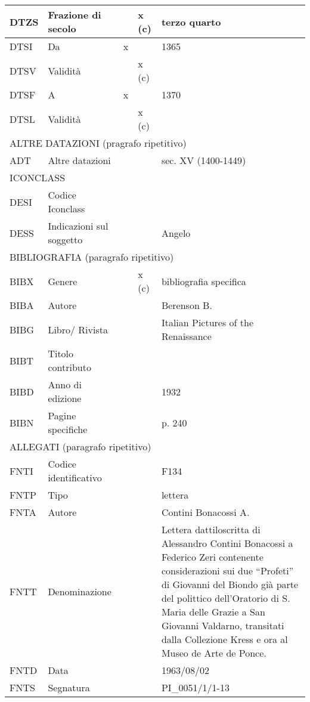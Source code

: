 \begin{center}
\begin{longtable}{ | p{1cm} | p{4cm} | p{.6cm} | p{.6cm} | p{5cm} | }
  DTZS & Frazione di secolo &  & x (c) & terzo quarto  \\ \hline
  DTSI & Da & x &  & 1365  \\ \hline
  DTSV & Validità &  & x (c) &   \\ \hline
  DTSF & A & x &  & 1370  \\ \hline
  DTSL & Validità &  & x (c) &   \\ \hline
  \multicolumn{5}{|l|}{\cellcolor{lightcyan}ALTRE DATAZIONI (pragrafo ripetitivo)} \\ \hline
  ADT & Altre datazioni &  &  & sec. XV (1400-1449)  \\ \hline
  \multicolumn{5}{|l|}{\cellcolor{lightcyan}ICONCLASS} \\ \hline
  DESI & Codice Iconclass &  &  &   \\ \hline
  DESS & Indicazioni sul soggetto &  &  & Angelo  \\ \hline
  \multicolumn{5}{|l|}{\cellcolor{lightcyan}BIBLIOGRAFIA (paragrafo ripetitivo)} \\ \hline
  BIBX & Genere &  & x (c) & bibliografia specifica  \\ \hline
  BIBA & Autore &  &  & Berenson B.  \\ \hline
  BIBG & Libro/ Rivista &  &  & Italian Pictures of the Renaissance  \\ \hline
  BIBT & Titolo contributo &  &  &   \\ \hline
  BIBD & Anno di edizione &  &  & 1932  \\ \hline
  BIBN & Pagine specifiche &  &  & p. 240  \\ \hline
  \multicolumn{5}{|l|}{\cellcolor{lightcyan}ALLEGATI (paragrafo ripetitivo)} \\ \hline
  FNTI & Codice identificativo &  &  & F134  \\ \hline
  FNTP & Tipo &  &  & lettera  \\ \hline
  FNTA & Autore &  &  & Contini Bonacossi A.  \\ \hline
  FNTT & Denominazione &  &  & Lettera dattiloscritta di Alessandro Contini Bonacossi a Federico Zeri contenente considerazioni sui due ``Profeti'' di Giovanni del Biondo già parte del polittico dell'Oratorio di S. Maria delle Grazie a San Giovanni Valdarno, transitati dalla Collezione Kress e ora al Museo de Arte de Ponce.  \\ \hline
  FNTD & Data &  &  & 1963/08/02  \\ \hline
  FNTS & Segnatura &  &  & PI\_0051/1/1-13  \\ \hline

\end{longtable}
\end{center}
